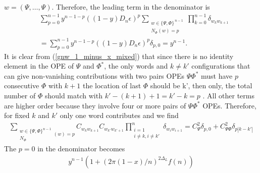 \documentclass[11pt]{article}
\newcommand{\ep}{\epsilon}
\newcommand{\nn}{\nonumber}
\newcommand{\JM}[1]{\textcolor{orange}{#1}}
\begin{document}
  $w=(\Psi,\dots,\Psi)$. Therefore, the leading term in the denominator is
  \begin{align}
    &\sum_{p=0}^{n-1}y^{n-1-p}((1-y)D_n\ep)^p\sum_{\substack{w\in\{\Psi,\Phi\}^{\,n-1}\\ N_\Phi(w)=p}}\prod_{k=0}^{n-1}\delta_{w_kw_  {k+1}}\nn\\
    &=\sum_{p=0}^{n-1}y^{n-1-p}((1-y) D_n\ep)^p\delta_{p,0}=y^{n-1}.
  \end{align}
It is clear from (\ref{gnw_1_minus_x_mixed}) that since there is no identity element in the OPE of 
$\Psi$ and $\Phi^*$, the only words and $k\neq k'$ configurations that can give non-vanishing contributions with two pairs OPEs $\Psi\Phi^*$ must have $p$ consecutive $\Phi$ with $k+1$ the 
location of last $\Phi$ should be k', then only, the total number of $\Phi$ should match with $k' - (k+1) +1 = k'-k =  p$
. All other terms are higher order because they involve four or more pairs of $\Psi\Phi^*$ OPEs.
Therefore, for fixed $k$ and $k'$ only one word contributes and we find
\begin{align}
  \sum_{\substack{w\in \{\Psi,\Phi\}^{n-1}\\N_\Phi}(w)=p}C_{w_k w_{k+1}}C_{w_{k'}w_{k'+1}}\prod_{\substack{i=1\\i\neq k,i\neq k'}}^n  \delta_{w_i w_{i+1}} =C_\Psi^2\delta_{p,0}+C_{\Psi\Phi}^2\delta_{p |k-k'|}
\end{align}
The $p=0$ in the denominator becomes
\begin{align}
y^{n-1} (1+(2\pi (1-x)/n)^{2\Delta_L}f(n))
\end{align}
\end{document}
